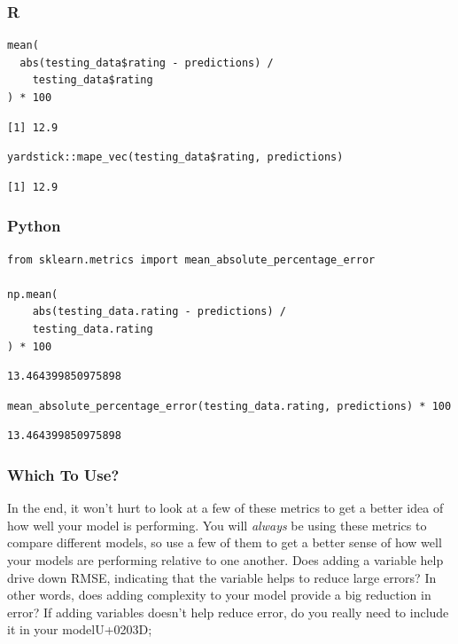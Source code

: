 \documentclass[
  letterpaper,
]{krantz}
\begin{document}
\subsubsection{R}

\begin{verbatim}
mean(
  abs(testing_data$rating - predictions) / 
    testing_data$rating
) * 100
\end{verbatim}

\begin{verbatim}
[1] 12.9
\end{verbatim}

\begin{verbatim}
yardstick::mape_vec(testing_data$rating, predictions)
\end{verbatim}

\begin{verbatim}
[1] 12.9
\end{verbatim}

\subsubsection{Python}

\begin{verbatim}
from sklearn.metrics import mean_absolute_percentage_error

np.mean(
    abs(testing_data.rating - predictions) / 
    testing_data.rating
) * 100
\end{verbatim}

\begin{verbatim}
13.464399850975898
\end{verbatim}

\begin{verbatim}
mean_absolute_percentage_error(testing_data.rating, predictions) * 100
\end{verbatim}

\begin{verbatim}
13.464399850975898
\end{verbatim}

\subsubsection{Which To Use?}\label{which-to-use}

In the end, it won't hurt to look at a few of these metrics to get a
better idea of how well your model is performing. You will \emph{always}
be using these metrics to compare different models, so use a few of them
to get a better sense of how well your models are performing relative to
one another. Does adding a variable help drive down RMSE, indicating
that the variable helps to reduce large errors? In other words, does
adding complexity to your model provide a big reduction in error? If
adding variables doesn't help reduce error, do you really need to
include it in your modelU+0203D;
\end{document}
